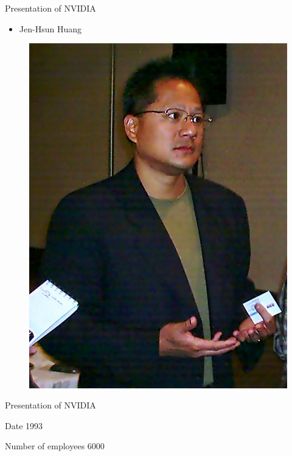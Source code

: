 \documentclass{beamer}
\begin{document}
\begin{frame}{Presentation of NVIDIA}
	\transdissolve[duration=0.08]
	\begin{block}{}
		\begin{itemize}
			\item<+->{Jen-Hsun Huang}
		\end{itemize}
	\end{block}
	\begin{figure}[h]
		\includegraphics[width=0.50\textheight]{JensenHuang.jpg}
	\end{figure}
\end{frame}

\begin{frame}{Presentation of NVIDIA}
	\begin{block}{Date}
		1993
	\end{block}	

	\pause
	\transdissolve[duration=0.1]

	\begin{block}{Number of employees}
		6000
	\end{block}
\end{frame}
\end{document}
